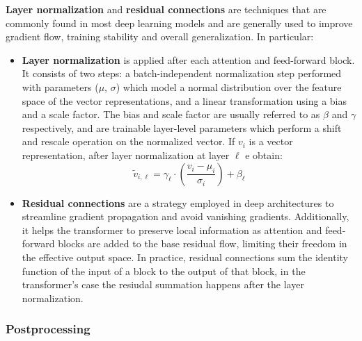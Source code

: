 \textbf{Layer normalization} and \textbf{residual connections} are techniques that are commonly found in most deep learning models and are generally used to improve gradient flow, training stability and overall generalization.
In particular:
\begin{itemize}
    \item \textbf{Layer normalization}  is applied after each attention and feed-forward block.
It consists of two steps: a batch-independent normalization step performed with parameters ($\mu$, $\sigma$) which model a normal distribution over the feature space of the vector representations, and a linear transformation using a bias and a scale factor.
The bias and scale factor are usually referred to as $\beta$ and $\gamma$ respectively, and are trainable layer-level parameters which perform a shift and rescale operation on the normalized vector.
If $v_i$ is a vector representation, after layer normalization at layer $\ell$ e obtain:
\begin{equation}
    \tilde v_{i,\ell} = \gamma_\ell \cdot \left( \frac{v_i - \mu_i}{\sigma_i} \right) + \beta_\ell
\end{equation}
    \item \textbf{Residual connections}  are a strategy employed in deep architectures to streamline gradient propagation and avoid vanishing gradients.
Additionally, it helps the transformer to preserve local information as attention and feed-forward blocks are added to the base residual flow, limiting their freedom in the effective output space.
In practice, residual connections sum the identity function of the input of a block to the output of that block, in the transformer's case the resiudal summation happens after the layer normalization.
\end{itemize}

\subsubsection*{Postprocessing}

